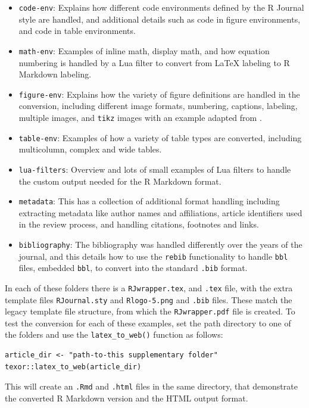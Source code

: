 \begin{itemize}
\tightlist
\item
  \texttt{code-env}: Explains how different code environments defined by the R Journal style are handled, and additional details such as code in figure environments, and code in table environments.
\item
  \texttt{math-env}: Examples of inline math, display math, and how equation numbering is handled by a Lua filter to convert from LaTeX labeling to R Markdown labeling.
\item
  \texttt{figure-env}: Explains how the variety of figure definitions are handled in the conversion, including different image formats, numbering, captions, labeling, multiple images, and \texttt{tikz} images with an example adapted from \citep{casflow}.
\item
  \texttt{table-env}: Examples of how a variety of table types are converted, including multicolumn, complex and wide tables.
\item
  \texttt{lua-filters}: Overview and lots of small examples of Lua filters to handle the custom output needed for the R Markdown format.
\item
  \texttt{metadata}: This has a collection of additional format handling including extracting metadata like author names and affiliations, article identifiers used in the review process, and handling citations, footnotes and links.
\item
  \texttt{bibliography}: The bibliography was handled differently over the years of the journal, and this details how to use the \texttt{rebib} functionality to handle \texttt{bbl} files, embedded \texttt{bbl}, to convert into the standard \texttt{.bib} format.
\end{itemize}

In each of these folders there is a \texttt{RJwrapper.tex}, and \texttt{.tex} file, with the extra template files \texttt{RJournal.sty} and \texttt{Rlogo-5.png} and \texttt{.bib} files. These match the legacy template file structure, from which the \texttt{RJwrapper.pdf} file is created. To test the conversion for each of these examples, set the path directory to one of the folders and use the \texttt{latex\_to\_web()} function as follows:

\begin{verbatim}
article_dir <- "path-to-this supplementary folder"
texor::latex_to_web(article_dir)
\end{verbatim}

This will create an \texttt{.Rmd} and \texttt{.html} files in the same directory, that demonstrate the converted R Markdown version and the HTML output format.

